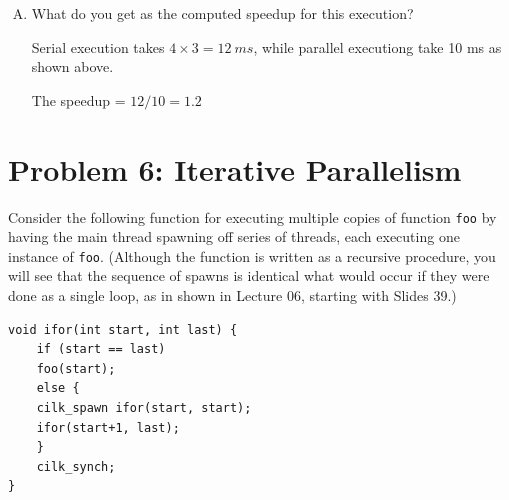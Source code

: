 \documentclass[11pt]{article}
\newenvironment{choice}{\begin{enumerate}[A.]}{\end{enumerate}}
\newenvironment{answer}{\begin{minipage}[c][1.5in]{\textwidth}}{\end{minipage}}
\begin{document}
\begin{choice}
\begin{center}
\begin{tabular}{|c|l|l|}
\end{tabular}
\end{center}

\newpage
\item What do you get as the computed speedup for this execution?

\begin{answer}
Serial execution takes $4\times3=12\ ms$, while parallel executiong take 10 ms as shown above. 

The speedup = $12 / 10 = 1.2$
\end{answer}
\end{choice}

\section*{Problem 6: Iterative Parallelism}

Consider the following function for executing multiple copies of
function \texttt{foo} by having the main thread spawning off series of
threads, each executing one instance of \texttt{foo}.  (Although the
function is written as a recursive procedure, you will see that the
sequence of spawns is identical what would occur if they were done as
a single loop, as in shown in Lecture 06, starting with Slides 39.)
\begin{lstlisting}
void ifor(int start, int last) {
    if (start == last)
	foo(start);
    else {
	cilk_spawn ifor(start, start);
	ifor(start+1, last);
    }
    cilk_synch;
}
\end{lstlisting}
\end{document}
